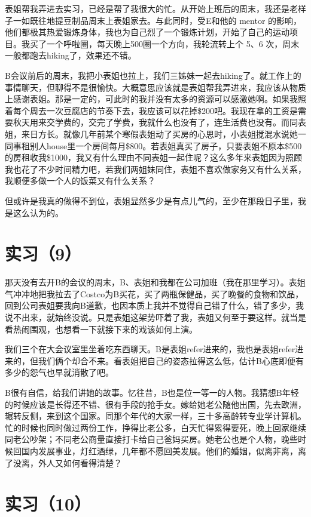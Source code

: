 \documentclass[12pt]{book}
\begin{document}
表姐帮我弄进去实习，已经是帮了我很大的忙。从开始上班后的周末，我还是老样子一如既往地提豆制品周末上表姐家去。与此同时，受E和他的 mentor 的影响，他们都极其热爱锻炼身体，我也为自己烈了一个锻炼计划，开始了自己的运动项目。我买了一个呼啦圈，每天晚上500圈一个方向，我轮流转上个 5、6 次，周末一般都跑去hiking了，效果还不错。

B会议前后的周末，我把小表姐也拉上，我们三姊妹一起去hiking了。就工作上的事情聊天，但聊得不是很愉快。大概意思应该就是表姐帮我弄进来，我应该从物质上感谢表姐。那是一定的，可此时的我并没有太多的资源可以感激她啊。如果我照着每个周去一次豆腐店的节奏下去，我应该可以花掉\$200吧。我现在拿的工资是需要秋天用来交学费的，交完了学费，我就什么也没有了，连生活费也没有。而同表姐，来日方长。就像几年前某个寒假表姐动了买房的心思时，小表姐搅混水说她一同事租别人house里一个房间每月\$800。若表姐真买了房子，只要表姐不原本\$500的房租收我\$1000，我又有什么理由不同表姐一起住呢？这么多年来表姐因为照顾我也花了不少时间精力吧，若我们两姐妹同住，表姐不喜欢做家务又有什么关系，我顺便多做一个人的饭菜又有什么关系？

但或许是我真的做得不到位，表姐显然多少是有点儿气的，至少在那段日子里，我是这么认为的。

\section{实习（9）}
\label{sec-5-12}

那天没有去开B的会议的周末，B、表姐和我都在公司加班（我在那里学习）。表姐气冲冲地把我拉去了Costco为B买花，买了两瓶保健品，买了晚餐的食物和饮品，回到公司表姐要我向B道歉，也因本质上我并不觉得自己错了什么，错了多少，我说不出来，就始终没说。只是表姐这架势吓着了我，表姐又何至于要这样。就当是看热闹围观，也想看一下就接下来的戏该如何上演。

我们三个在大会议室里坐着吃东西聊天。B是表姐refer进来的，我也是表姐refer进来的，但我们俩个却合不来。看表姐把自己的姿态拉得这么低，估计B心底即便有多少的怨气也早就消散了吧。

B很有自信，给我们讲她的故事。忆往昔，B也是位一等一的人物。我猜想B年轻的时候应该是长得还不错、很有手段的抢手女。嫁给她老公随他出国，先去欧洲，辗转反侧，来到这个国家。同那个年代的大家一样，三十多高龄转专业学计算机。 忙的时候也同时做过两份工作，挣得比老公多，白天忙得累得要死，晚上回家继续同老公吵架；不同老公商量直接打卡给自己爸妈买房。她老公也是个人物，晚些时候回国内发展事业，灯红酒绿，几年都不愿回美发展。他们的婚姻，似离非离，离了没离，外人又如何看得清楚？

\section{实习（10）}
\label{sec-5-13}
\end{document}
